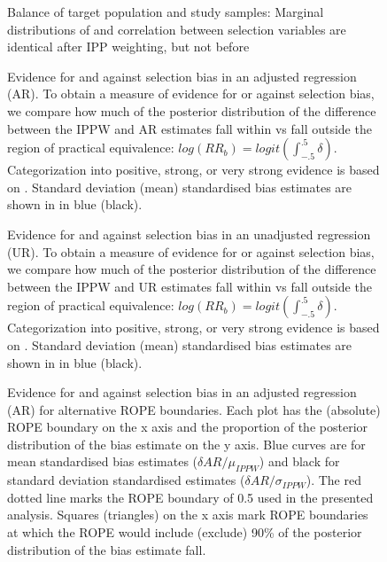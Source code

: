 \documentclass[12pt]{article}
\begin{document}
\begin{figure}[H]
	\centering
		
	\caption{Balance of target population and study samples: Marginal distributions of and correlation between selection variables are identical after IPP weighting, but not before}
	\label{fig:IPWbalance}
\end{figure}



\begin{figure}[H]
	\caption{Evidence for and against selection bias in an adjusted regression (AR). To obtain a measure of evidence for or against selection bias, we compare how much of the posterior distribution of the difference between the IPPW and AR estimates fall within vs fall outside the region of practical equivalence: $log(RR_b) = logit(\int_{-.5}^{.5}\delta)$. Categorization into positive, strong, or very strong evidence is based on \cite{Kass1995-uv}. Standard deviation (mean) standardised bias estimates are shown in in blue (black).} 
	\label{fig:logRRsAR}
\end{figure}

\begin{figure}[H]
	\caption{Evidence for and against selection bias in an unadjusted regression (UR). To obtain a measure of evidence for or against selection bias, we compare how much of the posterior distribution of the difference between the IPPW and UR estimates fall within vs fall outside the region of practical equivalence: $log(RR_b) = logit(\int_{-.5}^{.5}\delta)$. Categorization into positive, strong, or very strong evidence is based on \cite{Kass1995-uv}. Standard deviation (mean) standardised bias estimates are shown in in blue (black).} 
	\label{fig:logRRsUR}
\end{figure}

\begin{figure}[H]
	\centering 
	\caption{Evidence for and against selection bias in an adjusted regression (AR) for alternative ROPE boundaries. Each plot has the (absolute) ROPE boundary on the x axis and the proportion of the posterior distribution of the bias estimate on the y axis. Blue curves are for mean standardised bias estimates ($\delta{AR}/\mu_{IPPW}$) and black for standard deviation standardised estimates ($\delta{AR}/\sigma_{IPPW}$). The red dotted line marks the ROPE boundary of 0.5 used in the presented analysis. Squares (triangles) on the x axis mark ROPE boundaries at which the ROPE would include (exclude) 90\% of the posterior distribution of the bias estimate fall.}
	\label{fig:ropeplotsAR}
\end{figure}
\end{document}
